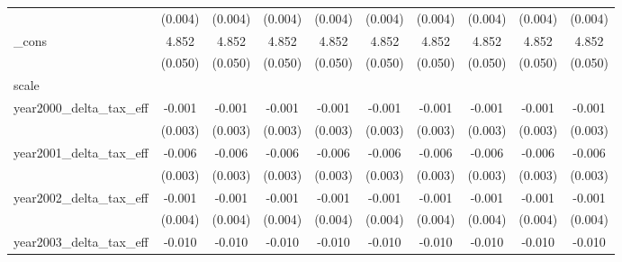 {\begin{tabular}{l*{9}{c}}
            &     (0.004)         &     (0.004)         &     (0.004)         &     (0.004)         &     (0.004)         &     (0.004)         &     (0.004)         &     (0.004)         &     (0.004)         \\
[1em]
_cons       &       4.852\sym{***}&       4.852\sym{***}&       4.852\sym{***}&       4.852\sym{***}&       4.852\sym{***}&       4.852\sym{***}&       4.852\sym{***}&       4.852\sym{***}&       4.852\sym{***}\\
            &     (0.050)         &     (0.050)         &     (0.050)         &     (0.050)         &     (0.050)         &     (0.050)         &     (0.050)         &     (0.050)         &     (0.050)         \\
\hline
scale       &                     &                     &                     &                     &                     &                     &                     &                     &                     \\
year2000_delta_tax_eff&      -0.001         &      -0.001         &      -0.001         &      -0.001         &      -0.001         &      -0.001         &      -0.001         &      -0.001         &      -0.001         \\
            &     (0.003)         &     (0.003)         &     (0.003)         &     (0.003)         &     (0.003)         &     (0.003)         &     (0.003)         &     (0.003)         &     (0.003)         \\
[1em]
year2001_delta_tax_eff&      -0.006\sym{*}  &      -0.006\sym{*}  &      -0.006\sym{*}  &      -0.006\sym{*}  &      -0.006\sym{*}  &      -0.006\sym{*}  &      -0.006\sym{*}  &      -0.006\sym{*}  &      -0.006\sym{*}  \\
            &     (0.003)         &     (0.003)         &     (0.003)         &     (0.003)         &     (0.003)         &     (0.003)         &     (0.003)         &     (0.003)         &     (0.003)         \\
[1em]
year2002_delta_tax_eff&      -0.001         &      -0.001         &      -0.001         &      -0.001         &      -0.001         &      -0.001         &      -0.001         &      -0.001         &      -0.001         \\
            &     (0.004)         &     (0.004)         &     (0.004)         &     (0.004)         &     (0.004)         &     (0.004)         &     (0.004)         &     (0.004)         &     (0.004)         \\
[1em]
year2003_delta_tax_eff&      -0.010\sym{***}&      -0.010\sym{***}&      -0.010\sym{***}&      -0.010\sym{***}&      -0.010\sym{***}&      -0.010\sym{***}&      -0.010\sym{***}&      -0.010\sym{***}&      -0.010\sym{***}\\

\end{tabular}}
